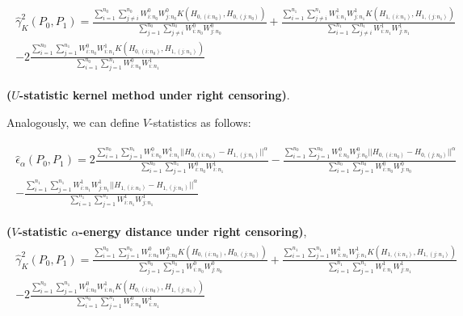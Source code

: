 \documentclass[11pt]{article}
\begin{document}
\begin{appendices}
\begin{gather}
\begin{align*}
\hat{\gamma}_K^{2}(P_0,P_1)=  \frac{\sum_{i=1}^{n_0}  \sum_{j\neq i}^{n_0} W^{0}_{i:n_0} W^{0}_{j:n_0} K(H_{0,(i:n_0)},H_{0,(j:n_0)})}{ \sum_{j=1}^{n_0} \sum_{j\neq i}^{n_0} W^{0}_{i:n_0} W^{0}_{j:n_0}}+ \frac{\sum_{i=1}^{n_1}  \sum_{j\neq i}^{n_1} W^{1}_{i:n_1} W^{1}_{j:n_1}  K(H_{1,(i:n_1)},H_{1,(j:n_1)})}{\sum_{i=1}^{n_1}  \sum_{j\neq i }^{n_1}W^{1}_{i:n_1} W^{1}_{j:n_1}}\\-2\frac{\sum_{i=1}^{n_0}  \sum_{j=1}^{n_1} W^{0}_{i:n_0} W^{1}_{i:n_1} K(H_{0,(i:n_0)},H_{1,(j:n_1)})}{\sum_{i=1}^{n_0}  \sum_{j=1}^{n_1} W^{0}_{i:n_0} W^{1}_{i:n_1}} \nonumber
\end{align*}
\end{gather}

\textbf{($U$-statistic kernel method under right censoring)}.


Analogously, we can define $V$-statistics as follows: 


\begin{gather}
\begin{align*}
\hat{\epsilon}_{\alpha}(P_0,P_1)= 2  \frac{\sum_{i=1}^{n_0}  \sum_{j=1}^{n_1} W^{0}_{i:n_0} W^{1}_{i:n_1} ||H_{0,(i:n_0)}-H_{1,(j:n_1)}||^{\alpha}}{\sum_{i=1}^{n_0}  \sum_{j=1}^{n_1} W^{0}_{i:n_0} W^{1}_{i:n_1}} - \frac{\sum_{i=1}^{n_0} \sum_{j=1 }^{n_0}  W^{0}_{i:n_0} W^{0}_{j:n_0}  ||H_{0,(i:n_0)}-H_{0,(j:n_0)}||^{\alpha}}{\sum_{i=1}^{n_0} \sum_{j= 1}^{n_0} W^{0}_{i:n_0} W^{0}_{j:n_0}} \\
- \frac{\sum_{i=1}^{n_1}  \sum_{j=1}^{n_1} W^{1}_{i:n_1} W^{1}_{j:n_1}  ||H_{1,(i:n_1)}-H_{1,(j:n_1)}||^{\alpha}}{\sum_{i=1}^{n_1}  \sum_{j=1}^{n_1} W^{1}_{i:n_1} W^{1}_{j:n_1}} \nonumber
\end{align*}
\end{gather}

\textbf{($V$-statistic $\alpha$-energy distance under right censoring)},
\begin{gather}
\begin{align*}
\hat{\gamma}_K^{2}(P_0,P_1)=  \frac{\sum_{i=1}^{n_0}  \sum_{j=1}^{n_0} W^{0}_{i:n_0} W^{0}_{j:n_0} K(H_{0,(i:n_0)},H_{0,(j:n_0)})}{ \sum_{j=1}^{n_0} \sum_{j=1}^{n_0} W^{0}_{i:n_0} W^{0}_{j:n_0}}+ \frac{\sum_{i=1}^{n_1}  \sum_{j=1}^{n_1} W^{1}_{i:n_1} W^{1}_{j:n_1}  K(H_{1,(i:n_1)},H_{1,(j:n_1)})}{\sum_{i=1}^{n_1}  \sum_{j=1 }^{n_1}W^{1}_{i:n_1} W^{1}_{j:n_1}}\\-2\frac{\sum_{i=1}^{n_0}  \sum_{j=1}^{n_1} W^{0}_{i:n_0} W^{1}_{i:n_1} K(H_{0,(i:n_0)},H_{1,(j:n_1)})}{\sum_{i=1}^{n_0}  \sum_{j=1}^{n_1} W^{0}_{i:n_0} W^{1}_{i:n_1}} \nonumber
\end{align*}
\end{gather}


\end{appendices}
\end{document}
